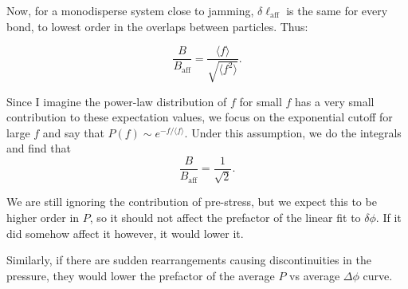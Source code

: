 \documentclass[aps,prl,twocolumn,letter,longbibliography,floatfix]{revtex4-1}
\begin{document}
Now, for a monodisperse system close to jamming, $\delta \ell_\mathrm{aff}$ is the same for every bond, to lowest order in the overlaps between particles. Thus:

\begin{equation}
    \frac{B}{B_{\mathrm{aff}}} = \frac{\langle f \rangle}{\sqrt{\langle f^2 \rangle} }.
\end{equation}

Since I imagine the power-law distribution of $f$ for small $f$ has a very small contribution to these expectation values, we focus on the exponential cutoff for large $f$ and say that $P{\left(f\right)} \sim e^{- f / \langle f \rangle}$. Under this assumption, we do the integrals and find that
\begin{equation}
    \frac{B}{B_{\mathrm{aff}}} = \frac{1}{\sqrt{2}} . 
\end{equation}

We are still ignoring the contribution of pre-stress, but we expect this to be higher order in $P$, so it should not affect the prefactor of the linear fit to $\delta \phi$. If it did somehow affect it however, it would lower it.

Similarly, if there are sudden rearrangements causing discontinuities in the pressure, they would lower the prefactor of the average $P$ vs average $\Delta \phi$ curve. 
\end{document}
